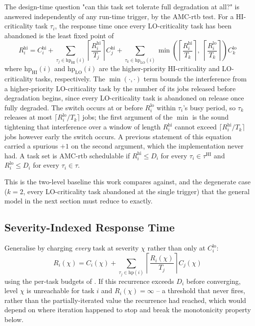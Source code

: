 \documentclass{article}
\begin{document}
The design-time question "can this task set tolerate full degradation at
all?" is answered independently of any run-time trigger, by the AMC-rtb test.
For a HI-criticality task $\tau_i$, the response time once every LO-criticality
task has been abandoned is the least fixed point of
\[
R_i^{\mathrm{hi}} = C_i^{\mathrm{hi}}
  + \sum_{\tau_j \in \mathrm{hp}_{\mathrm{HI}}(i)} \left\lceil \frac{R_i^{\mathrm{hi}}}{T_j} \right\rceil C_j^{\mathrm{hi}}
  + \sum_{\tau_k \in \mathrm{hp}_{\mathrm{LO}}(i)} \min\!\left( \left\lceil \frac{R_i^{\mathrm{hi}}}{T_k} \right\rceil,\; \left\lceil \frac{R_i^{\mathrm{lo}}}{T_k} \right\rceil \right) C_k^{\mathrm{lo}}
\]
where $\mathrm{hp}_{\mathrm{HI}}(i)$ and $\mathrm{hp}_{\mathrm{LO}}(i)$ are the
higher-priority HI-criticality and LO-criticality tasks, respectively. The
$\min(\cdot,\cdot)$ term bounds the interference from a higher-priority
LO-criticality task by the number of its jobs released before degradation
begins, since every LO-criticality task is abandoned on release once fully
degraded. The switch occurs at or before $R_i^{\mathrm{lo}}$ within $\tau_i$'s
busy period, so $\tau_k$ releases at most
$\lceil R_i^{\mathrm{lo}}/T_k \rceil$ jobs; the first argument of the $\min$ is
the sound tightening that interference over a window of length
$R_i^{\mathrm{hi}}$ cannot exceed $\lceil R_i^{\mathrm{hi}}/T_k \rceil$ jobs
however early the switch occurs. A previous statement of this equation carried
a spurious $+1$ on the second argument, which the implementation never had. A task set is AMC-rtb schedulable if $R_i^{\mathrm{hi}}
\leq D_i$ for every $\tau_i \in \tau^{\mathrm{HI}}$ and $R_i^{\mathrm{lo}} \leq
D_i$ for every $\tau_i \in \tau$.

This is the two-level baseline this work compares against, and the degenerate
case ($k = 2$, every LO-criticality task abandoned at the single trigger) that
the general model in the next section must reduce to exactly.

\subsection{Severity-Indexed Response Time}
\label{sec:severity-response}

Generalise  by charging \emph{every} task at severity $\chi$
rather than only at $C_i^{\mathrm{lo}}$:
\[
R_i(\chi) = C_i(\chi) + \sum_{\tau_j \in \mathrm{hp}(i)} \left\lceil \frac{R_i(\chi)}{T_j} \right\rceil C_j(\chi)
\]
using the per-task budgets of . If this recurrence
exceeds $D_i$ before converging, level $\chi$ is unreachable for task $i$ and
$R_i(\chi) = \infty$ -- a threshold that never fires, rather than the
partially-iterated value the recurrence had reached, which would depend on
where iteration happened to stop and break the monotonicity property below.
\end{document}
